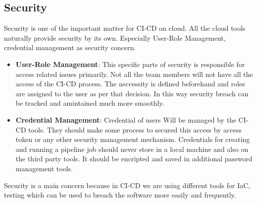 \subsection{Security}
Security is one of the important matter for CI-CD on cloud. All the cloud tools naturally provide security by its own. Especially User-Role Management, credential management as security concern.
\begin{itemize}
	\item \textbf{User-Role Management}: This specific parts of security is responsible for access related issues primarily. Not all the team members will not have all the access of the CI-CD process. The neccessity is defined beforehand and roles are assigned to the user as per that decision. In this way security breach can be tracked and amintained much more smoothly.
	\item \textbf{Credential Management}: Credential of users Will be managed by the CI-CD tools. They should make some process to secured this access by access token or any other security management mechanism. Credentials for creating and running a pipeline job should never store in a local machine and also on the third party tools. It should be encripted and saved in additional password management tools.
\end{itemize}
Security is a main concern because in CI-CD we are using different tools for IaC, testing which can be used to breach the software more easily and frequently.
